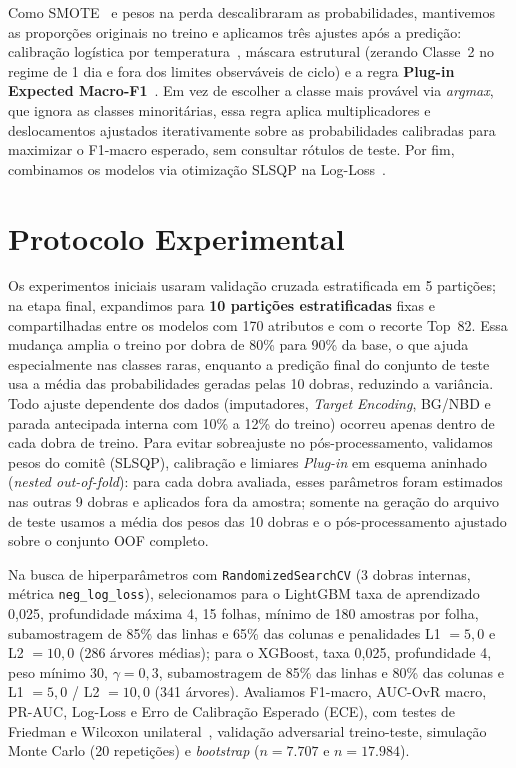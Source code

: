 \documentclass[10pt, conference, compsocconf]{IEEEtran}
\begin{document}
Como SMOTE~\cite{chawla2002smote} e pesos na perda descalibraram as probabilidades, mantivemos as proporções originais no treino e aplicamos três ajustes após a predição: calibração logística por temperatura~\cite{guo2017calibration}, máscara estrutural (zerando Classe~2 no regime de 1 dia e fora dos limites observáveis de ciclo) e a regra \textbf{Plug-in Expected Macro-F1}~\cite{lipton2014f1}. Em vez de escolher a classe mais provável via \textit{argmax}, que ignora as classes minoritárias, essa regra aplica multiplicadores e deslocamentos ajustados iterativamente sobre as probabilidades calibradas para maximizar o F1-macro esperado, sem consultar rótulos de teste. Por fim, combinamos os modelos via otimização SLSQP na Log-Loss~\cite{caruana2004ensemble}.

\section{Protocolo Experimental}
Os experimentos iniciais usaram validação cruzada estratificada em 5 partições; na etapa final, expandimos para \textbf{10 partições estratificadas} fixas e compartilhadas entre os modelos com 170 atributos e com o recorte Top~82. Essa mudança amplia o treino por dobra de 80\% para 90\% da base, o que ajuda especialmente nas classes raras, enquanto a predição final do conjunto de teste usa a média das probabilidades geradas pelas 10 dobras, reduzindo a variância. Todo ajuste dependente dos dados (imputadores, \textit{Target Encoding}, BG/NBD e parada antecipada interna com 10\% a 12\% do treino) ocorreu apenas dentro de cada dobra de treino. Para evitar sobreajuste no pós-processamento, validamos pesos do comitê (SLSQP), calibração e limiares \textit{Plug-in} em esquema aninhado (\textit{nested out-of-fold}): para cada dobra avaliada, esses parâmetros foram estimados nas outras 9 dobras e aplicados fora da amostra; somente na geração do arquivo de teste usamos a média dos pesos das 10 dobras e o pós-processamento ajustado sobre o conjunto OOF completo.

Na busca de hiperparâmetros com \texttt{RandomizedSearchCV} (3 dobras internas, métrica \texttt{neg\_log\_loss}), selecionamos para o LightGBM taxa de aprendizado 0,025, profundidade máxima 4, 15 folhas, mínimo de 180 amostras por folha, subamostragem de 85\% das linhas e 65\% das colunas e penalidades L1 $=5{,}0$ e L2 $=10{,}0$ (286 árvores médias); para o XGBoost, taxa 0,025, profundidade 4, peso mínimo 30, $\gamma=0{,}3$, subamostragem de 85\% das linhas e 80\% das colunas e L1 $=5{,}0$ / L2 $=10{,}0$ (341 árvores). Avaliamos F1-macro, AUC-OvR macro, PR-AUC, Log-Loss e Erro de Calibração Esperado (ECE), com testes de Friedman e Wilcoxon unilateral~\cite{demsar2006statistical}, validação adversarial treino-teste, simulação Monte Carlo (20 repetições) e \textit{bootstrap} ($n=7.707$ e $n=17.984$).
\end{document}
